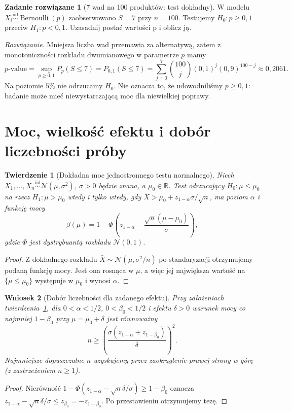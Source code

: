 \documentclass[11pt,a4paper,oneside]{report}
\numberwithin{equation}{chapter}
\theoremstyle{plain}
\newtheorem{twierdzenie}{Twierdzenie}[chapter]
\newtheorem{wniosek}[twierdzenie]{Wniosek}
\theoremstyle{definition}
\newtheorem{zadanie}{Zadanie rozwiązane}[chapter]
\theoremstyle{remark}
\newcommand{\R}{\mathbb R}
\newcommand{\Normal}{\mathcal N}
\newcommand{\iid}{\mathrel{\overset{\mathrm{iid}}\sim}}
\begin{document}
\begin{zadanie}[7 wad na 100 produktów: test dokładny]\label{zad:binom-test}
W modelu $X_i\iid\operatorname{Bernoulli}(p)$
zaobserwowano $S=7$ przy $n=100$. Testujemy
$H_0:p\ge0{,}1$ przeciw $H_1:p<0{,}1$.
Uzasadnij postać wartości p i oblicz ją.
\par\emph{Rozwiązanie.} Mniejsza liczba wad przemawia za
alternatywą, zatem z monotoniczności rozkładu dwumianowego
w parametrze $p$ mamy
\[
 p\text{-value}=\sup_{p\ge0{,}1}P_p(S\le7)
 =P_{0{,}1}(S\le7)
 =\sum_{j=0}^7\binom{100}{j}(0{,}1)^j(0{,}9)^{100-j}
 \approx0{,}2061.
\]
Na poziomie $5\%$ nie odrzucamy $H_0$. Nie oznacza to,
że udowodniliśmy $p\ge0{,}1$: badanie może mieć
niewystarczającą moc dla niewielkiej poprawy.
\end{zadanie}

\section{Moc, wielkość efektu i dobór liczebności próby}
\begin{twierdzenie}[Dokładna moc jednostronnego testu normalnego]
\label{thm:normal-power}
Niech $X_1,\ldots,X_n\iid\Normal(\mu,\sigma^2)$,
$\sigma>0$ będzie znana, a $\mu_0\in\R$.
Test odrzucający $H_0:\mu\le\mu_0$ na rzecz
$H_1:\mu>\mu_0$ wtedy i tylko wtedy, gdy
$\bar X>\mu_0+z_{1-\alpha}\sigma/\sqrt n$, ma
poziom $\alpha$ i funkcję mocy
\[
 \beta(\mu)=1-\Phi\left(z_{1-\alpha}
 -\frac{\sqrt n(\mu-\mu_0)}{\sigma}\right),
\]
gdzie $\Phi$ jest dystrybuantą rozkładu $\Normal(0,1)$.
\end{twierdzenie}
\begin{proof}
Z dokładnego rozkładu $\bar X\sim\Normal(\mu,\sigma^2/n)$
po standaryzacji otrzymujemy podaną funkcję mocy.
Jest ona rosnąca w $\mu$, a więc jej największa wartość na
$\{\mu\le\mu_0\}$ występuje w $\mu_0$ i wynosi $\alpha$.
\end{proof}

\begin{wniosek}[Dobór liczebności dla zadanego efektu]
\label{cor:normal-sample-size}
Przy założeniach twierdzenia~\ref{thm:normal-power}, dla
$0<\alpha<1/2$, $0<\beta_0<1/2$ i efektu $\delta>0$
warunek mocy co najmniej $1-\beta_0$ przy $\mu=\mu_0+\delta$
jest równoważny
\[
 n\ge\left(\frac{\sigma(z_{1-\alpha}+z_{1-\beta_0})}
 {\delta}\right)^2.
\]
Najmniejsze dopuszczalne $n$ uzyskujemy przez
zaokrąglenie prawej strony w górę (z zastrzeżeniem $n\ge1$).
\end{wniosek}
\begin{proof}
Nierówność $1-\Phi(z_{1-\alpha}-\sqrt n\delta/\sigma)
\ge1-\beta_0$ oznacza
$z_{1-\alpha}-\sqrt n\delta/\sigma\le z_{\beta_0}
=-z_{1-\beta_0}$. Po przestawieniu otrzymujemy tezę.
\end{proof}
\end{document}
